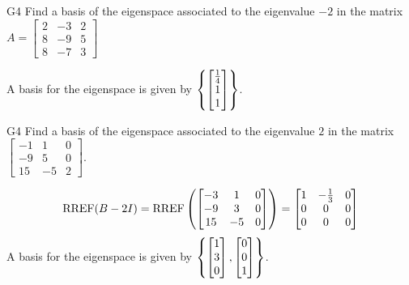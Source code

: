 \begin{problem}{G4}
Find a basis of the eigenspace associated to the eigenvalue $-2$ in the matrix $A=\begin{bmatrix}2 & -3 & 2 \\ 8 & -9 & 5 \\ 8 & -7 & 3\end{bmatrix}$
\end{problem}
\begin{solution}
A basis for the eigenspace is given by $\left\{\begin{bmatrix} \frac{1}{4} \\ 1 \\ 1 \end{bmatrix}\right\}$.
\end{solution}


\begin{problem}{G4}
Find a basis of the eigenspace associated to the eigenvalue $2$ in the matrix $\begin{bmatrix} -1 & 1 & 0 \\ -9 & 5 & 0 \\ 15 & -5 & 2 \end{bmatrix}$.
\end{problem}

\begin{solution}
$$\operatorname{RREF}(B-2I)=\operatorname{RREF}\left(\begin{bmatrix} -3 & 1 & 0 \\ -9 & 3 & 0 \\ 15 & - 5 & 0 \end{bmatrix} \right) = \begin{bmatrix} 1 & -\frac{1}{3} & 0 \\ 0 & 0 & 0 \\ 0 & 0 & 0 \end{bmatrix}$$
A basis for the eigenspace is given by \(\left\{\begin{bmatrix} 1 \\ 3 \\ 0 \end{bmatrix}, \begin{bmatrix} 0 \\ 0 \\ 1\end{bmatrix}\right\}\).
\end{solution}
